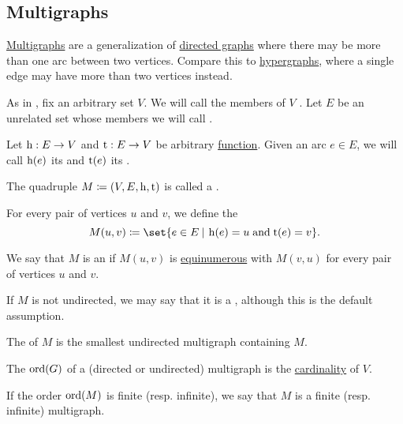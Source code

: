 \subsection{Multigraphs}\label{subsec:multigraphs}

\hyperref[def:multigraph]{Multigraphs} are a generalization of \hyperref[def:graph/directed]{directed graphs} where there may be more than one arc between two vertices. Compare this to \hyperref[def:hypergraph]{hypergraphs}, where a single edge may have more than two vertices instead.

\begin{definition}\label{def:multigraph}
  As in , fix an arbitrary set \( V \). We will call the members of \( V \) . Let \( E \) be an unrelated set whose members we will call .

  Let \( \operatorname{h}: E \to V \) and \( \operatorname{t}: E \to V \) be arbitrary \hyperref[def:function]{function}. Given an arc \( e \in E \), we will call \( \operatorname{h}(e) \) its  and \( \operatorname{t}(e) \) its .

  The quadruple \( M \coloneqq (V, E, \operatorname{h}, \operatorname{t}) \) is called a .

  \begin{thmenum}
     For every pair of vertices \( u \) and \( v \), we define the 
    \begin{equation}\label{eq:def:multigraph/arc_set}
      M(u, v) \coloneqq \set{ e \in E \given \head(e) = u \T{and} \tail(e) = v }.
    \end{equation}

     We say that \( M \) is an  if \( M(u, v) \) is \hyperref[def:equinumerosity]{equinumerous} with \( M(v, u) \) for every pair of vertices \( u \) and \( v \).

     If \( M \) is not undirected, we may say that it is a , although this is the default assumption.

     The  of \( M \) is the smallest undirected multigraph containing \( M \).

     The  \( \operatorname{ord}(G) \) of a (directed or undirected) multigraph is the \hyperref[thm:cardinality_existence]{cardinality} of \( V \).

    If the order \( \operatorname{ord}(M) \) is finite (resp. infinite), we say that \( M \) is a finite (resp. infinite) multigraph.
  \end{thmenum}
\end{definition}
